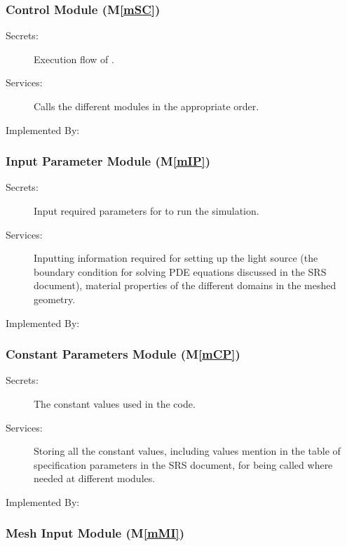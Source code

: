 \documentclass[12pt, titlepage]{article}
\newcommand{\mref}[1]{M\ref{#1}}
\begin{document}
	\subsubsection{\progname{} Control Module (\mref{mSC})}
	
	\begin{description} \item[Secrets:]Execution flow of \progname{}.
		\item[Services:]Calls the different modules in the appropriate order.
		\item[Implemented By:] \progname{} \end{description}
	
	


	\subsubsection{Input Parameter Module (\mref{mIP})}
	
	\begin{description} \item[Secrets:]Input required parameters for \progname{} to
		run the simulation. \item[Services:]Inputting information required for setting
		up the light source (the boundary condition for solving PDE equations discussed
		in the SRS document), material properties of the different domains in the meshed
		geometry. \item[Implemented By:] \progname{} \end{description}
	
	


	\subsubsection{Constant Parameters Module (\mref{mCP})}
	
	\begin{description} \item[Secrets:] The constant values used in the code.
		\item[Services:] Storing all the constant values, including values mention in
		the table of specification parameters in the SRS document, for being called
		where needed at different modules. \item[Implemented By:] \progname{}
	\end{description}
	
	
	
	\subsubsection{Mesh Input Module (\mref{mMI})}
	
\end{document}
